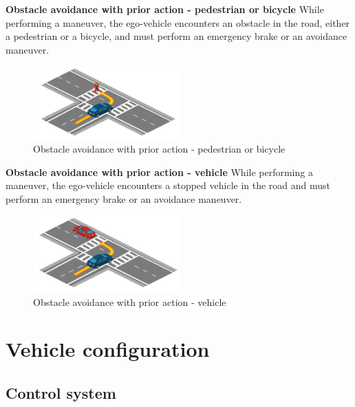 \documentclass{article}
\begin{document}
\textbf{Obstacle avoidance with prior action - pedestrian or bicycle} 
While performing a maneuver, the ego-vehicle encounters an obstacle in the road, either a pedestrian or a bicycle, and must perform an emergency brake 
or an avoidance maneuver.
\begin{figure}[h]
    \centering
    \includegraphics[width=0.5\textwidth]{img/TR04.png}
    \caption{Obstacle avoidance with prior action - pedestrian or bicycle} \label{Scenario_obsAvoidanceWithPedBic}
\end{figure}

\textbf{Obstacle avoidance with prior action - vehicle} 
While performing a maneuver, the ego-vehicle encounters a stopped vehicle in the road and must perform an emergency brake or an avoidance maneuver.
\begin{figure}[h]
    \centering
    \includegraphics[width=0.5\textwidth]{img/TR19a.png}
    \caption{Obstacle avoidance with prior action - vehicle} \label{Scenario_obsAvoidanceWithoutVehicle}
\end{figure}

\section{Vehicle configuration}

\subsection{Control system}
\end{document}
